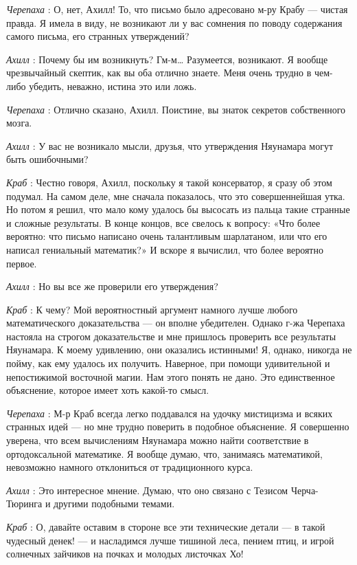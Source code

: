 \documentclass[../main.tex]{subfiles}
\begin{document}
\begin{dialogue}
\emph{Черепаха} : О, нет, Ахилл! То, что письмо было адресовано м-ру Крабу --- чистая правда. Я имела в виду, не возникают ли у вас сомнения по поводу содержания самого письма, его странных утверждений?

\emph{Ахилл} : Почему бы им возникнуть? Гм-м\ldots{} Разумеется, возникают. Я вообще чрезвычайный скептик, как вы оба отлично знаете. Меня очень трудно в чем-либо убедить, неважно, истина это или ложь.

\emph{Черепаха} : Отлично сказано, Ахилл. Поистине, вы знаток секретов собственного мозга.

\emph{Ахилл} : У вас не возникало мысли, друзья, что утверждения Няунамара могут быть ошибочными?

\emph{Краб} : Честно говоря, Ахилл, поскольку я такой консерватор, я сразу об этом подумал. На самом деле, мне сначала показалось, что это совершеннейшая утка. Но потом я решил, что мало кому удалось бы высосать из пальца такие странные и сложные результаты. В конце концов, все свелось к вопросу: «Что более вероятно: что письмо написано очень талантливым шарлатаном, или что его написал гениальный математик?» И вскоре я вычислил, что более вероятно первое.

\emph{Ахилл} : Но вы все же проверили его утверждения?

\emph{Краб} : К чему? Мой вероятностный аргумент намного лучше любого математического доказательства --- он вполне убедителен. Однако г-жа Черепаха настояла на строгом доказательстве и мне пришлось проверить все результаты Няунамара. К моему удивлению, они оказались истинными! Я, однако, никогда не пойму, как ему удалось их получить. Наверное, при помощи удивительной и непостижимой восточной магии. Нам этого понять не дано. Это единственное объяснение, которое имеет хоть какой-то смысл.

\emph{Черепаха} : М-р Краб всегда легко поддавался на удочку мистицизма и всяких странных идей --- но мне трудно поверить в подобное объяснение. Я совершенно уверена, что всем вычислениям Няунамара можно найти соответствие в ортодоксальной математике. Я вообще думаю, что, занимаясь математикой, невозможно намного отклониться от традиционного курса.

\emph{Ахилл} : Это интересное мнение. Думаю, что оно связано с Тезисом Черча-Тюринга и другими подобными темами.

\emph{Краб} : О, давайте оставим в стороне все эти технические детали --- в такой чудесный денек! --- и насладимся лучше тишиной леса, пением птиц, и игрой солнечных зайчиков на почках и молодых листочках Хо!


\end{dialogue}
\end{document}
